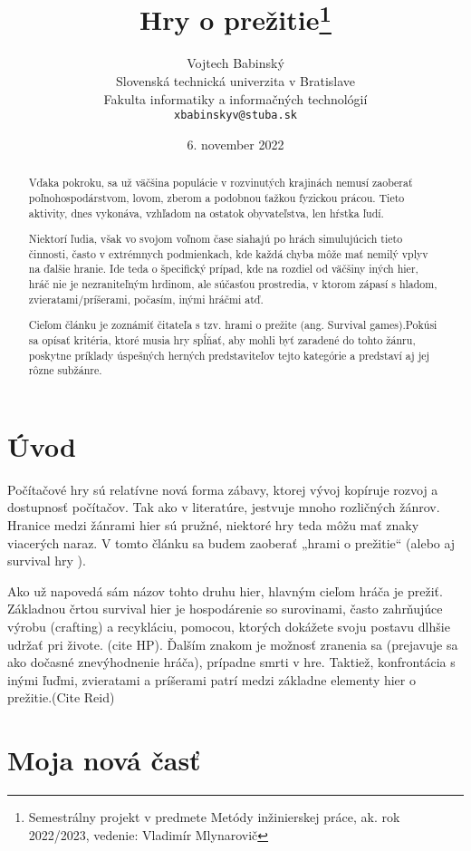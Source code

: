 \documentclass[10pt,twoside,slovak,a4paper]{article}
\title{Hry o prežitie\thanks{Semestrálny projekt v predmete Metódy inžinierskej práce, ak. rok 2022/2023, vedenie: Vladimír Mlynarovič}} %
\author{Vojtech Babinský\\[2pt]
	{\small Slovenská technická univerzita v Bratislave}\\
	{\small Fakulta informatiky a informačných technológií}\\
	{\small \texttt{xbabinskyv@stuba.sk}}
	}
\date{\small 6. november 2022} %
\begin{document}
\maketitle

\begin{abstract}

Vďaka pokroku, sa už väčšina populácie v rozvinutých krajinách nemusí zaoberať poľnohospodárstvom, lovom, zberom a podobnou ťažkou fyzickou prácou. Tieto aktivity, dnes vykonáva, vzhľadom na ostatok obyvateľstva, len hŕstka ľudí. 

Niektorí ľudia, však vo svojom voľnom čase siahajú po hrách simulujúcich tieto činnosti, často v extrémnych podmienkach, kde každá chyba môže mať nemilý vplyv na ďalšie hranie. Ide teda o špecifický prípad, kde na rozdiel od väčšiny iných hier, hráč nie je nezraniteľným hrdinom, ale súčasťou prostredia, v ktorom zápasí s hladom, zvieratami/príšerami, počasím, inými hráčmi atď. 

Cieľom článku je zoznámiť čitateľa s tzv. hrami o prežite (ang. Survival games).Pokúsi sa opísať kritéria, ktoré musia hry spĺňať, aby mohli byť zaradené do tohto žánru, poskytne príklady  úspešných herných predstaviteľov tejto kategórie a predstaví aj jej rôzne subžánre. 
\end{abstract}


\newpage


\section{Úvod}
Počítačové hry sú relatívne nová forma zábavy, ktorej vývoj kopíruje rozvoj a dostupnosť počítačov. Tak ako v literatúre, jestvuje mnoho rozličných žánrov. Hranice medzi žánrami hier sú pružné, niektoré hry teda môžu mať znaky viacerých naraz. V tomto článku sa budem zaoberať „hrami o prežitie“ (alebo aj survival hry ). 

Ako už napovedá sám názov tohto druhu hier, hlavným cieľom hráča je prežiť. Základnou črtou survival hier je hospodárenie so surovinami, často zahrňujúce výrobu (crafting) a recykláciu, pomocou, ktorých dokážete svoju postavu dlhšie udržať pri živote. (cite HP). Ďalším znakom je možnosť zranenia sa (prejavuje sa ako dočasné znevýhodnenie hráča), prípadne smrti v hre. Taktiež, konfrontácia s inými ľuďmi, zvieratami a príšerami patrí medzi základne elementy hier o prežitie.(Cite Reid)



\section{Moja nová časť}
\cite{Toppo}
\end{document}
